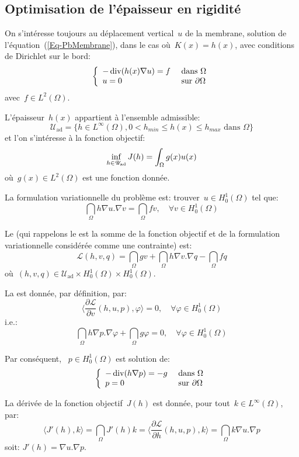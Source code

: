 \medskip
\subsection{Optimisation de l'épaisseur en rigidité}

On s'intéresse toujours au déplacement vertical~$u$ de la membrane, solution de l'équation~(\ref{Eq-PbMembrane}), dans le cas où~$K(x)=h(x)$, avec conditions de Dirichlet sur le bord:
\[\left\{\begin{array}{ll} -\operatorname{div} (h(x)\nabla u)=f &\text{ dans }\Omega\\ u=0 &\text{ sur }\partial\Omega \end{array} \right. \]
avec~$f\in L^2(\Omega)$.

L'épaisseur~$h(x)$ appartient à l'ensemble admissible:
\[ \mathscr{U}_{\text{ad}} = \{ h\in L^\infty(\Omega), 0< h_{min}\le h(x)\le h_{max} \text{ dans }\Omega \} \]
et l'on s'intéresse à la fonction objectif:
\[\colorblue \inf_{h\in\mathscr{U}_{\text{ad}}} J(h) = \dint_\Omega g(x)u(x) \]
où~$g(x)\in L^2(\Omega)$ est une fonction donnée.

\medskip
La formulation variationnelle du problème est: trouver~$u\in H^1_0(\Omega)$ tel que:
\[ \dint_\Omega h\nabla u.\nabla v=\dint_\Omega fv, \quad \forall v\in H^1_0(\Omega) \]

Le  (qui rappelons le est la somme de la fonction objectif et de la formulation variationnelle considérée comme une contrainte) est:
\[ \mathscr{L}(h,v,q) = \dint_\Omega gv + \dint_\Omega h\nabla v.\nabla q - \dint_\Omega fq \]
où~$(h,v,q)\in \mathscr{U}_{\text{ad}}\times H^1_0(\Omega)\times H^1_0(\Omega)$.

\medskip
La  est donnée, par définition, par:
\[ \langle \dfrac{\partial \mathscr{L}}{\partial v}(h,u,p),\varphi\rangle=0, \quad \forall\varphi\in H^1_0(\Omega) \]
i.e.:
\[ \dint_\Omega h\nabla p.\nabla\varphi + \dint_\Omega g\varphi =0, \quad \forall\varphi\in H^1_0(\Omega) \]

Par conséquent, ~$p\in H^1_0(\Omega)$ est solution de:
\[\left\{\begin{array}{ll}
-\operatorname{div}(h\nabla p) = -g &\text{ dans }\Omega\\
p=0 &\text{ sur }\partial\Omega
\end{array}\right.\]

\medskip
La dérivée de la fonction objectif~$J(h)$ est donnée, pour tout~$k\in L^\infty(\Omega)$, par:
\[ \langle J'(h),k\rangle = \dint_\Omega J'(h)k = \langle\dfrac{\partial\mathscr{L}}{\partial h}(h,u,p),k\rangle =\dint_\Omega k\nabla u.\nabla p \]
soit: $J'(h)=\nabla u.\nabla p$.


